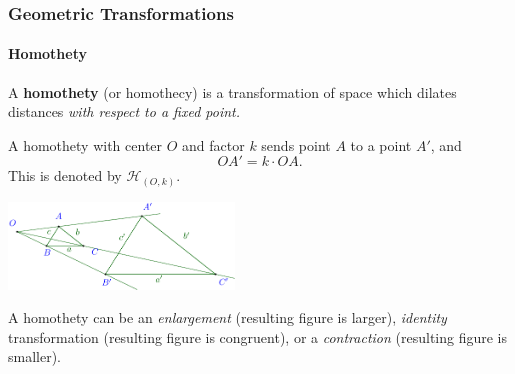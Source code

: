\documentclass[8pt,xcolor=table,dvipsnames]{beamer}
\begin{document}
\begin{frame}[t]
    \frametitle{Geometric Transformations}
    \framesubtitle{Homothety}
    \begin{definition}[Homothety]
        A \textbf{homothety} (or homothecy) is a transformation of space
        which dilates distances \textit{with respect to a fixed point.}

        A homothety with center $O$ and factor $k$ sends point $A$ to a point $A'$, and
        \[
            OA'=k\cdot OA.
        \]
        This is denoted by $\mathcal{H}_{(O, k)}$.
    \end{definition}
    
    \begin{center}
        \includegraphics[width=6cm]{./svg/pdf/homothety-1.pdf}
    \end{center}

    A homothety can be an \textit{enlargement} (resulting figure is larger),
    \textit{identity} transformation (resulting figure is congruent),
    or a \textit{contraction} (resulting figure is smaller).
\end{frame}
\end{document}
